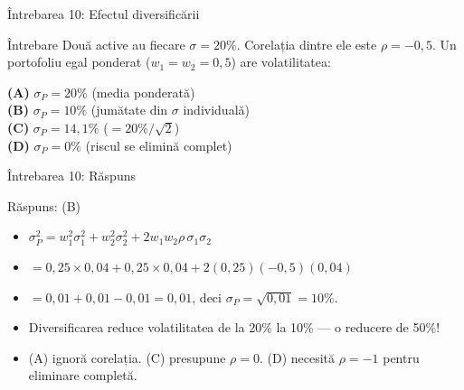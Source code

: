 \documentclass[9pt, aspectratio=169, t]{beamer}
\theoremstyle{definition}
\newenvironment{cminipage}[1]{%
    \par\noindent\hfill\begin{minipage}{#1}\ignorespaces
}{%
    \end{minipage}\hfill\null\par
}
\begin{document}
\begin{frame}{Întrebarea 10: Efectul diversificării}
    \begin{cminipage}{0.95\textwidth}
    \begin{block}{Întrebare}
    Două active au fiecare $\sigma = 20\%$. Corelația dintre ele este $\rho = -0{,}5$.
    Un portofoliu egal ponderat ($w_1 = w_2 = 0{,}5$) are volatilitatea:
    \end{block}

    \vspace{0.2cm}
    \textcolor{MainBlue}{\textbf{(A)}} $\sigma_P = 20\%$ (media ponderată)\\[6pt]
    \textcolor{MainBlue}{\textbf{(B)}} $\sigma_P = 10\%$ (jumătate din $\sigma$ individuală)\\[6pt]
    \textcolor{MainBlue}{\textbf{(C)}} $\sigma_P = 14{,}1\%$ ($= 20\%/\sqrt{2}$)\\[6pt]
    \textcolor{MainBlue}{\textbf{(D)}} $\sigma_P = 0\%$ (riscul se elimină complet)
    \end{cminipage}
\end{frame}

\begin{frame}{Întrebarea 10: Răspuns}
    \begin{cminipage}{0.95\textwidth}
    \begin{exampleblock}{Răspuns: (B)}
    \begin{itemize}
        \item $\sigma_P^2 = w_1^2\sigma_1^2 + w_2^2\sigma_2^2 + 2w_1 w_2\rho\,\sigma_1\sigma_2$
        \item $= 0{,}25 \times 0{,}04 + 0{,}25 \times 0{,}04 + 2(0{,}25)(-0{,}5)(0{,}04)$
        \item $= 0{,}01 + 0{,}01 - 0{,}01 = 0{,}01$, deci $\sigma_P = \sqrt{0{,}01} = 10\%$.
        \item Diversificarea reduce volatilitatea de la 20\% la 10\% — o reducere de 50\%!
        \item (A) ignoră corelația. (C) presupune $\rho = 0$. (D) necesită $\rho = -1$ pentru eliminare completă.
    \end{itemize}
    \end{exampleblock}
    \end{cminipage}
\end{frame}

\end{document}
